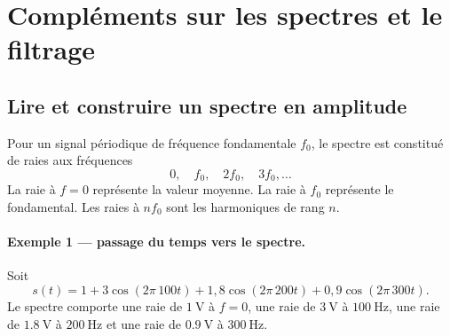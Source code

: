 
\clearpage
\section{Compléments sur les spectres et le filtrage}\label{sec:elec-complements-spectres-filtrage}

\subsection{Lire et construire un spectre en amplitude}\label{sec:elec-spectres-exemples}

Pour un signal périodique de fréquence fondamentale $f_0$, le spectre est constitué de raies aux fréquences
\[
0,\quad f_0,\quad 2f_0,\quad 3f_0,\ldots
\]
La raie à $f=0$ représente la valeur moyenne. La raie à $f_0$ représente le fondamental. Les raies à $nf_0$ sont les harmoniques de rang $n$.

\begin{center}
\end{center}

\paragraph{Exemple 1 — passage du temps vers le spectre.}
Soit
\[
s(t)=1+3\cos(2\pi\,100t)+1{,}8\cos(2\pi\,200t)+0{,}9\cos(2\pi\,300t).
\]
Le spectre comporte une raie de $\SI{1}{\volt}$ à $f=0$, une raie de $\SI{3}{\volt}$ à $\SI{100}{\hertz}$, une raie de $\SI{1.8}{\volt}$ à $\SI{200}{\hertz}$ et une raie de $\SI{0.9}{\volt}$ à $\SI{300}{\hertz}$.

